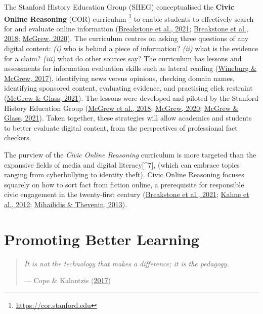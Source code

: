 \documentclass[letterpaper, nobind]{templates/ociamthesis}
\begin{document}
The Stanford History Education Group (SHEG) conceptualised the \textbf{Civic
Online Reasoning} (COR) curriculum \footnote{\url{https://cor.stanford.edu}} to enable students to
effectively search for and evaluate online information
(\protect\hyperlink{ref-breakstone2021students}{Breakstone et al., 2021}; \protect\hyperlink{ref-breakstone2018we}{Breakstone et al., 2018}; \protect\hyperlink{ref-mcgrew2020learning}{McGrew, 2020}). The
curriculum centres on asking three questions of any digital content:
\emph{(i)} who is behind a piece of information? \emph{(ii)} what is the evidence
for a claim? \emph{(iii)} what do other sources say? The curriculum has
lessons and assessments for information evaluation skills such as
lateral reading (\protect\hyperlink{ref-wineburg2017lateral}{Wineburg \& McGrew, 2017}), identifying news versus
opinions, checking domain names, identifying sponsored content,
evaluating evidence, and practising click restraint (\protect\hyperlink{ref-mcgrew2021click}{McGrew \& Glass, 2021}).
The lessons were developed and piloted by the Stanford History Education
Group (\protect\hyperlink{ref-mcgrew2018can}{McGrew et al., 2018}; \protect\hyperlink{ref-mcgrew2020learning}{McGrew, 2020}; \protect\hyperlink{ref-mcgrew2021click}{McGrew \& Glass, 2021}). Taken
together, these strategies will allow academics and students to better
evaluate digital content, from the perspectives of professional fact
checkers.

The purview of the \emph{Civic Online Reasoning} curriculum is more targeted
than the expansive fields of media and digital literacy{[}\^{}7{]}, (which can
embrace topics ranging from cyberbullying to identity theft). Civic
Online Reasoning focuses squarely on how to sort fact from fiction
online, a prerequisite for responsible civic engagement in the
twenty-first century
(\protect\hyperlink{ref-breakstone2021students}{Breakstone et al., 2021}; \protect\hyperlink{ref-kahne2012digital}{Kahne et al., 2012}; \protect\hyperlink{ref-mihailidis2013media}{Mihailidis \& Thevenin, 2013}).

\hypertarget{sec-bg-learn-promoting-learning}{%
\section{Promoting Better Learning}\label{sec-bg-learn-promoting-learning}}

\begin{quote}
\emph{It is not the technology that makes a difference; it is the pedagogy.}

\hfill --- Cope \& Kalantzis (\protect\hyperlink{ref-cope2017elearningc}{2017})
\end{quote}
\end{document}
